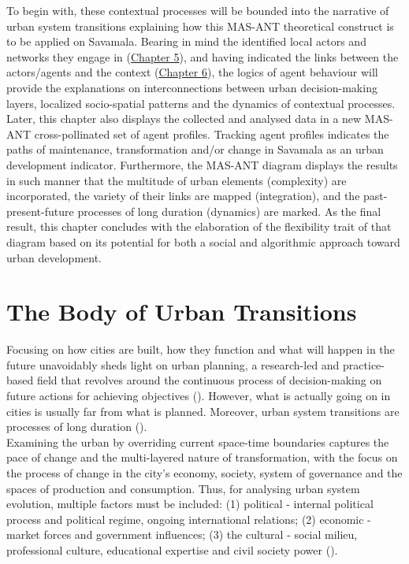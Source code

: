 \documentclass[11pt]{report}
\begin{document}
{{{{To begin with, these contextual processes will be bounded into the narrative of urban system transitions explaining how this MAS-ANT theoretical construct is to be applied on Savamala.
Bearing in mind the identified local actors and networks they engage in (\href{Chapter 5}{Chapter 5}), and having indicated the links between the actors/agents and the context (\href{Chapter 6}{Chapter 6}), the logics of agent behaviour will provide the explanations on interconnections between urban decision-making layers, localized socio-spatial patterns and the dynamics of contextual processes.
Later, this chapter also displays the collected and analysed data in a new MAS-ANT cross-pollinated set of agent profiles.
Tracking agent profiles indicates the paths of maintenance, transformation and/or change in Savamala as an urban development indicator. Furthermore, the MAS-ANT diagram displays the results in such manner that the multitude of urban elements (complexity) are incorporated, the variety of their links are mapped (integration), and the past-present-future processes of long duration (dynamics) are marked. As the final result, this chapter concludes with the elaboration of the flexibility trait of that diagram based on its potential for both a social and algorithmic approach toward urban development.

\section{The Body of Urban Transitions}

Focusing on how cities are built, how they function and what will happen in the future unavoidably sheds light on urban planning, a research-led and practice-based field that revolves around the continuous process of decision-making on future actions for achieving objectives  (\href{Stojkov}{\citealt{stojkov_teorijska_2012}}).
However, what is actually going on in cities is usually far from what is planned.
Moreover, urban system transitions are processes of long duration (\href{Braudel}{\citealt{braudel_history_1970}}).
\\

Examining the urban by overriding current space-time boundaries captures the pace of change and the multi-layered nature of transformation, with the focus on the process of change in the city’s economy, society, system of governance and the spaces of production and consumption. Thus, for analysing urban system evolution, multiple factors must be included: (1) political - internal political process and political regime, ongoing international relations; (2) economic - market forces and government influences; (3)  the cultural - social milieu, professional culture, educational expertise and civil society power (\href{NedovicBudic}{\citealt{nedovicbudic_waves_2006}}).
\\

}}}}
\end{document}
